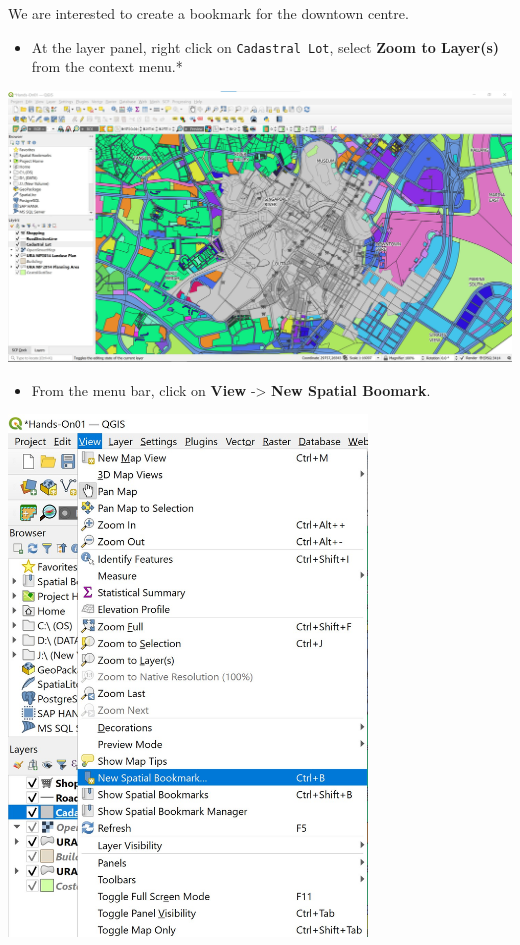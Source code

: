\documentclass[
  letterpaper,
  DIV=11,
  numbers=noendperiod]{scrreprt}
\providecommand{\tightlist}{%
  \setlength{\itemsep}{0pt}\setlength{\parskip}{0pt}}\usepackage{longtable,booktabs,array}
\begin{document}
We are interested to create a bookmark for the downtown centre.

\begin{itemize}
\tightlist
\item
  At the layer panel, right click on \texttt{Cadastral\ Lot}, select
  \textbf{Zoom to Layer(s)} from the context menu.*
\end{itemize}

\includegraphics{./img02/image31.jpg}

\begin{itemize}
\tightlist
\item
  From the menu bar, click on \textbf{View} -\textgreater{} \textbf{New
  Spatial Boomark}.
\end{itemize}

\includegraphics[width=3.75in,height=\textheight]{./img02/image32.jpg}
\end{document}
